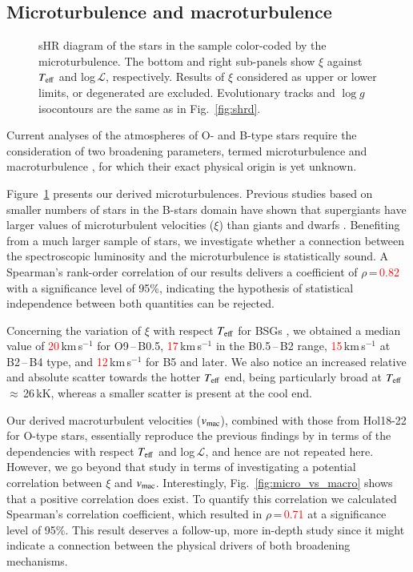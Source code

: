 \documentclass{aa}
\newcommand{\vmac} {$v_{\rm mac}$\xspace}
\newcommand{\vmic}{$\xi$\xspace}
\newcommand{\Teff}{\mbox{$T_{\rm eff}$}\xspace}
\newcommand{\logg}{\mbox{$\log g$}\xspace}
\newcommand{\Ls}{$ \mathcal{L}$\xspace}
\newcommand{\kms}{\,\mbox{km\,s$^{-1}$}\xspace}
\newcommand{\num}[1]{\textcolor{red}{#1}}
\begin{document}
\subsection{Microturbulence and macroturbulence}
\label{subsection:53_tmp}

\begin{figure}[!t]
\centering
{}
\caption{sHR diagram of the stars in the sample color-coded by the microturbulence. The bottom and right sub-panels show \vmic against \Teff and log\,\Ls, respectively. Results of \vmic considered as upper or lower limits, or degenerated are excluded. Evolutionary tracks and \logg isocontours are the same as in Fig.~\ref{fig:shrd}.}
\label{fig:shrd_micro}
\end{figure}  

Current analyses of the atmospheres of O- and B-type stars require the consideration of two broadening parameters, termed microturbulence \citep[see, e.g.,][]{mcerlean98, smith98, vink00} and macroturbulence \citep[e.g.][]{ryans02, simon-diaz14a, simon-diaz17}, for which their exact physical origin is yet unknown.

Figure~\ref{fig:shrd_micro} presents our derived microturbulences. Previous studies based on smaller numbers of stars in the B-stars domain have shown that supergiants have larger values of microturbulent velocities (\vmic) than giants and dwarfs \citep{gies92, hunter07, lefever07, markova08, hunter08, webmayer22}. Benefiting from a much larger sample of stars, we investigate whether a connection between the spectroscopic luminosity and the microturbulence is statistically sound. A Spearman's rank-order correlation of our results delivers a coefficient of $\rho$\,=\,\num{0.82} with a significance level of 95\%, indicating the hypothesis of statistical independence between both quantities can be rejected.

Concerning the variation of \vmic with respect \Teff for BSGs \citep[see, for example][]{markova08}, we obtained a median value of \num{20}\kms for O9\,--\,B0.5, \num{17}\kms in the B0.5\,--\,B2 range, \num{15}\kms at B2\,--\,B4 type, and \num{12}\kms for B5 and later. We also notice an increased relative and absolute scatter towards the hotter \Teff end, being particularly broad at \Teff$\approx$\,26\,kK, whereas a smaller scatter is present at the cool end.

Our derived macroturbulent velocities (\vmac), combined with those from Hol18-22 for O-type stars, essentially reproduce the previous findings by \citet{simon-diaz17} in terms of the dependencies with respect \Teff and log\,\Ls, and hence are not repeated here. However, we go beyond that study in terms of investigating a potential correlation between \vmic and \vmac. Interestingly, Fig.~\ref{fig:micro_vs_macro} shows that a positive correlation does exist. 
To quantify this correlation we calculated Spearman's correlation coefficient, which resulted in $\rho$\,=\,\num{0.71} at a significance level of 95\%. This result deserves a follow-up, more in-depth study since it might indicate a connection between the physical drivers of both broadening mechanisms.
\end{document}
